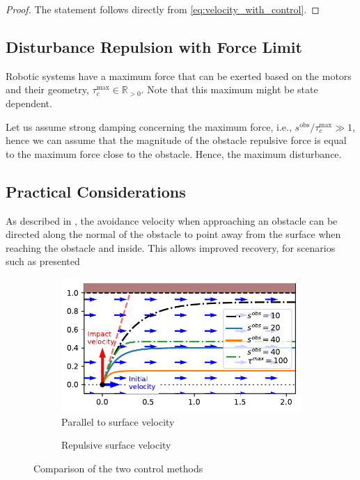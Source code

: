 \documentclass[conference]{IEEEtran}
\begin{document}
\begin{proof}
The statement follows directly from \eqref{eq:velocity_with_control}.
\end{proof}

\subsection{Disturbance Repulsion with Force Limit}
Robotic systems have a maximum force that can be exerted based on the motors and their geometry, $\tau_c^{\mathrm{max}} \in \mathbb{R}_{>0}$. Note that this maximum might be state dependent.

Let  us assume strong damping concerning the maximum force, i.e., $s^{\mathrm{obs}} / \tau_c^{\mathrm{max}} \gg 1$, hence we can assume that the magnitude of the obstacle repulsive force is equal to the maximum force close to the obstacle. Hence, the maximum disturbance.

\subsection{Practical Considerations}
As described in \cite{huber2022avoiding, huber2023avoidance}, the avoidance velocity when approaching an obstacle can be directed along the normal of the obstacle to point away from the surface when reaching the obstacle and inside. This allows improved recovery, for scenarios such as presented 

\begin{figure}
\centering
\begin{subfigure}{0.99\columnwidth}
  \centerline{\includegraphics[width=\textwidth]{figures/parallel_avoidance_obstacle}}
  \caption{Parallel to surface velocity}
  \label{fig:disturbance_with_parallel_velocity}
\end{subfigure}
\begin{subfigure}{0.5\columnwidth}
  \caption{Repulsive surface velocity}
  \label{fig:disturbance_with_repulsive_velocity}
\end{subfigure}
\caption{Comparison of the two control methods}
\label{fig:disturbance_rejection_schematics}
\end{figure}
\end{document}
